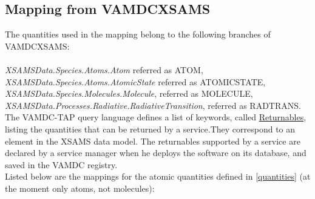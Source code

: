 \documentclass[11pt,a4paper]{ivoa}
\begin{document}
\subsection{Mapping from VAMDCXSAMS}

The quantities used in the mapping belong to the following branches of VAMDCXSAMS:\\\\
\textit{XSAMSData.Species.Atoms.Atom}  referred as ATOM,\\
\textit{XSAMSData.Species.Atoms.AtomicState}  referred as ATOMICSTATE,\\
\textit{XSAMSData.Species.Molecules.Molecule}, referred as MOLECULE,\\
\textit{XSAMSData.Processes.Radiative.RadiativeTransition}, referred as RADTRANS.\\

The VAMDC-TAP query language defines a list of keywords, called \href{https://standards.vamdc.eu/dictionary/returnables.html}{Returnables}, listing the quantities that can be returned by a service.They correspond to an element in the XSAMS data model. The returnables supported by a service are declared by a service manager when he deploys the software on its database, and saved in the VAMDC registry. \\

Listed below are the mappings for the atomic quantities defined in \ref{quantities} (at the moment only atoms, not molecules):
\end{document}
